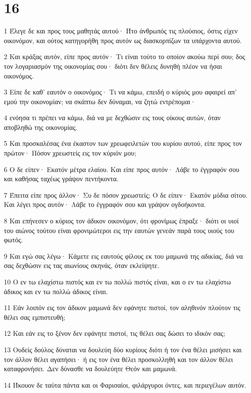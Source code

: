 \chapter{16}

\par 1 Έλεγε δε και προς τους μαθητάς αυτού· Ήτο άνθρωπός τις πλούσιος, όστις είχεν οικονόμον, και ούτος κατηγορήθη προς αυτόν ως διασκορπίζων τα υπάρχοντα αυτού.
\par 2 Και κράξας αυτόν, είπε προς αυτόν· Τι είναι τούτο το οποίον ακούω περί σου; δος τον λογαριασμόν της οικονομίας σου· διότι δεν θέλεις δυνηθή πλέον να ήσαι οικονόμος.
\par 3 Είπε δε καθ' εαυτόν ο οικονόμος· Τι να κάμω, επειδή ο κύριός μου αφαιρεί απ' εμού την οικονομίαν; να σκάπτω δεν δύναμαι, να ζητώ εντρέπομαι·
\par 4 ενόησα τι πρέπει να κάμω, διά να με δεχθώσιν εις τους οίκους αυτών, όταν αποβληθώ της οικονομίας.
\par 5 Και προσκαλέσας ένα έκαστον των χρεωφειλετών του κυρίου αυτού, είπε προς τον πρώτον· Πόσον χρεωστείς εις τον κύριόν μου;
\par 6 Ο δε είπεν· Εκατόν μέτρα ελαίου. Και είπε προς αυτόν· Λάβε το έγγραφόν σου και καθήσας ταχέως γράψον πεντήκοντα.
\par 7 Έπειτα είπε προς άλλον· Συ δε πόσον χρεωστείς; Ο δε είπεν· Εκατόν μόδια σίτου. Και λέγει προς αυτόν· Λάβε το έγγραφόν σου και γράψον ογδοήκοντα.
\par 8 Και επήνεσεν ο κύριος τον άδικον οικονόμον, ότι φρονίμως έπραξε· διότι οι υιοί του αιώνος τούτου είναι φρονιμώτεροι εις την εαυτών γενεάν παρά τους υιούς του φωτός.
\par 9 Και εγώ σας λέγω· Κάμετε εις εαυτούς φίλους εκ του μαμωνά της αδικίας, διά να σας δεχθώσιν εις τας αιωνίους σκηνάς, όταν εκλείψητε.
\par 10 Ο εν τω ελαχίστω πιστός και εν τω πολλώ πιστός είναι, και ο εν τω ελαχίστω άδικος και εν τω πολλώ άδικος είναι.
\par 11 Εάν λοιπόν εις τον άδικον μαμωνά δεν εφάνητε πιστοί, τον αληθινόν πλούτον τις θέλει σας εμπιστευθή;
\par 12 Και εάν εις το ξένον δεν εφάνητε πιστοί, τις θέλει σας δώσει το ιδικόν σας;
\par 13 Ουδείς δούλος δύναται να δουλεύη δύο κυρίους διότι ή τον ένα θέλει μισήσει και τον άλλον θέλει αγαπήσει· ή εις τον ένα θέλει προσκολληθή και τον άλλον θέλει καταφρονήσει. Δεν δύνασθε να δουλεύητε Θεόν και μαμωνά.
\par 14 Ήκουον δε ταύτα πάντα και οι Φαρισαίοι, φιλάργυροι όντες, και περιεγέλων αυτόν.
